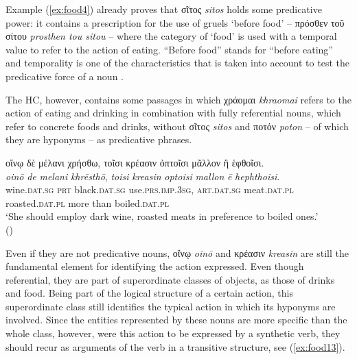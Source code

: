 \documentclass[output=paper,colorlinks,citecolor=brown]{langscibook}
\begin{document}
Example (\ref{ex:food4}) already proves that σῖτος \textit{sitos} holds some predicative power: it contains a prescription for the use of gruels ‘before food’ – πρόσθεν τοῦ σίτου \textit{prosthen tou sitou} – where the category of ‘food’ is used with a temporal value to refer to the action of eating. “Before food” stands for “before eating” and temporality is one of the characteristics that is taken into account to test the predicative force of a noun \citep[48--50]{SimonePompei2007}.

The HC,  however, contains some passages in which χράομαι \textit{khraomai} refers to the action of eating and drinking in combination with fully referential nouns, which refer to concrete foods and drinks, without σῖτος \textit{sitos} and ποτόν \textit{poton} – of which they are hyponyms – as predicative phrases.

\begin{exe}
\ex\label{ex:food12}
\glll οἴνῳ δὲ μέλανι χρήσθω, τοῖσι κρέασιν ὀπτοῖσι μᾶλλον ἢ ἑφθοῖσι.\\ 
\textit{oinō} \textit{de} \textit{melani} \textit{khrēsthō}, \textit{toisi} \textit{kreasin} \textit{optoisi} \textit{mallon} \textit{ē} \textit{hephthoisi}.\\
wine.\textsc{dat.sg} \textsc{prt} black.\textsc{dat.sg} use.\textsc{prs.imp.3sg}, \textsc{art.dat.sg} meat.\textsc{dat.pl} roasted.\textsc{dat.pl} more than boiled.\textsc{dat.pl} \\
\glt ‘She should employ dark wine, roasted meats in preference to boiled ones.' \\
\hspace*{\fill}()
\end{exe}

Even if they are not predicative nouns, οἴνῳ \textit{oinō} and κρέασιν \textit{kreasin} are still the fundamental element for identifying the action expressed. Even though referential, they are part of superordinate classes of objects, as those of drinks and food. Being part of the logical structure of a certain action, this superordinate class still identifies the typical action in which its hyponyms are involved. Since the entities represented by these nouns are more specific than the whole class, however, were this action to be expressed by a synthetic verb, they should recur as arguments of the verb in a transitive structure, see (\ref{ex:food13}).
\end{document}
